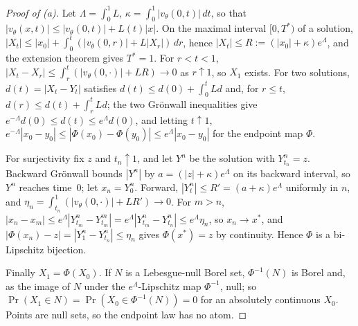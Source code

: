 \documentclass{article} %
\theoremstyle{plain}
\theoremstyle{definition}
\theoremstyle{remark}
\begin{document}
\begin{proof}[Proof of (a)]
Let $\Lambda=\int_0^1L$, $\kappa=\int_0^1|v_\theta(0,t)|\,dt$, so that
$|v_\theta(x,t)|\le|v_\theta(0,t)|+L(t)|x|$. On the maximal interval $[0,T^*)$ of a solution,
$|X_t|\le|x_0|+\int_0^t(|v_\theta(0,r)|+L|X_r|)\,dr$, hence $|X_t|\le R:=(|x_0|+\kappa)e^\Lambda$,
and the extension theorem gives $T^*=1$. For $r<t<1$,
$|X_t-X_r|\le\int_r^t(|v_\theta(0,\cdot)|+LR)\to0$ as $r\uparrow1$, so $X_1$ exists. For two
solutions, $d(t)=|X_t-Y_t|$ satisfies $d(t)\le d(0)+\int_0^tLd$ and, for $r\le t$,
$d(r)\le d(t)+\int_r^tLd$; the two Gr\"onwall inequalities give
$e^{-\Lambda}d(0)\le d(t)\le e^\Lambda d(0)$, and letting $t\uparrow1$,
$e^{-\Lambda}|x_0-y_0|\le|\Phi(x_0)-\Phi(y_0)|\le e^\Lambda|x_0-y_0|$ for the endpoint map
$\Phi$.

For surjectivity fix $z$ and $t_n\uparrow1$, and let $Y^n$ be the solution with $Y^n_{t_n}=z$.
Backward Gr\"onwall bounds $|Y^n|$ by $a=(|z|+\kappa)e^\Lambda$ on its backward interval, so
$Y^n$ reaches time~$0$; let $x_n=Y^n_0$. Forward, $|Y^n_t|\le R'=(a+\kappa)e^\Lambda$ uniformly in
$n$, and $\eta_n=\int_{t_n}^1(|v_\theta(0,\cdot)|+LR')\to0$. For $m>n$,
$|x_n-x_m|\le e^\Lambda|Y^n_{t_m}-Y^m_{t_m}|=e^\Lambda|Y^n_{t_m}-Y^n_{t_n}|\le e^\Lambda\eta_n$,
so $x_n\to x^\ast$, and $|\Phi(x_n)-z|=|Y^n_1-Y^n_{t_n}|\le\eta_n$ gives $\Phi(x^\ast)=z$ by
continuity. Hence $\Phi$ is a bi-Lipschitz bijection.

Finally $X_1=\Phi(X_0)$. If $N$ is a Lebesgue-null Borel set, $\Phi^{-1}(N)$ is Borel and, as the
image of $N$ under the $e^\Lambda$-Lipschitz map $\Phi^{-1}$, null; so
$\Pr(X_1\in N)=\Pr(X_0\in\Phi^{-1}(N))=0$ for an absolutely continuous $X_0$. Points are null
sets, so the endpoint law has no atom.
\end{proof}
\end{document}
